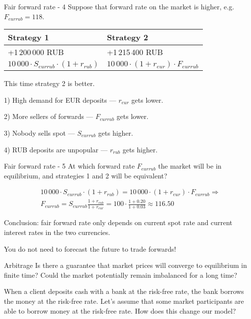\documentclass{beamer}
\begin{document}
\begin{frame}{Fair forward rate - 4}
\justify
Suppose that forward rate on the market is higher, e.g. $F_{eurrub}=118$.


\justify
\centering
\begin{tabular}{l|l}
Strategy 1 & Strategy 2 \\ \hline
+1\,200\,000 RUB  & +1\,215\,400 RUB \\
$10\,000 \cdot S_{eurrub} \cdot (1+r_{rub})$ & $10\,000 \cdot (1+r_{eur}) \cdot F_{eurrub}$
\end{tabular}

\justify
This time strategy 2 is better. 

1) High demand for EUR deposits --- $r_{eur}$ gets lower.

2) More sellers of forwards --- $F_{eurrub}$ gets lower.

3) Nobody sells spot --- $S_{eurrub}$ gets higher. 

4) RUB deposits are unpopular --- $r_{rub}$ gets higher.
\end{frame}



\begin{frame}{Fair forward rate - 5}
\justify
At which forward rate $F_{eurrub}$ the market will be in equilibrium, and strategies 1 and 2 will be equivalent?

\begin{align*}
&10\,000 \cdot S_{eurrub} \cdot (1 + r_{rub}) = 10\,000 \cdot (1+r_{eur}) \cdot F_{eurrub} \Rightarrow \\
&F_{eurrub} = S_{eurrub} \frac{1 + r_{rub}}{1 + r_{eur}} = 100 \cdot \frac{1 + 0.20}{1 + 0.03} \approx 116.50
\end{align*}

\justify
Conclusion: fair forward rate only depends on current spot rate and current interest rates in the two currencies.

\justify
You do not need to forecast the future to trade forwards!
\end{frame}



\begin{frame}{Arbitrage}
\justify
Is there a guarantee that market prices will converge to equilibrium in finite time? Could the market potentially remain imbalanced for a long time?

\justify
When a client deposits cash with a bank at the risk-free rate, the bank borrows the money at the risk-free rate. Let's assume that some market participants are able to borrow money at the risk-free rate. How does this change our model?
\end{frame}
\end{document}
